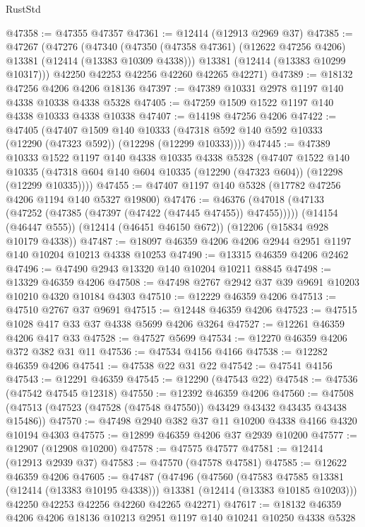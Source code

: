 \begin{lexlean}{RustStd}
\begin{coremodule}
@47358 := @47355 @47357
@47361 := @12414 (@12913 @2969 @37)
@47385 := @47267
    (@47276
      (@47340
        (@47350 (@47358 @47361) (@12622 @47256 @4206) @13381 (@12414 (@13383 @10309 @4338)))
        @13381
        (@12414 (@13383 @10299 @10317)))
      @42250
      @42253
      @42256
      @42260
      @42265
      @42271)
@47389 := @18132 @47256 @4206 @4206 @18136
@47397 := @47389 @10331 @2978 @1197 @140 @4338 @10338 @4338 @5328
@47405 := @47259 @1509 @1522 @1197 @140 @4338 @10333 @4338 @10338
@47407 := @14198 @47256 @4206
@47422 := @47405
    (@47407
      @1509
      @140
      @10333
      (@47318 @592 @140 @592 @10333 (@12290 (@47323 @592)) (@12298 (@12299 @10333))))
@47445 := @47389
    @10333
    @1522
    @1197
    @140
    @4338
    @10335
    @4338
    @5328
    (@47407
      @1522
      @140
      @10335
      (@47318 @604 @140 @604 @10335 (@12290 (@47323 @604)) (@12298 (@12299 @10335))))
@47455 := @47407 @1197 @140 @5328 (@17782 @47256 @4206 @1194 @140 @5327 @19800)
@47476 := @46376
    (@47018 (@47133 (@47252 (@47385 (@47397 (@47422 (@47445 @47455)) @47455)))))
    (@14154 (@46447 @555))
    (@12414 (@46451 @46150 @672))
    (@12206 (@15834 @928 @10179 @4338))
@47487 := @18097 @46359 @4206 @4206 @2944 @2951 @1197 @140 @10204 @10213 @4338 @10253
@47490 := @13315 @46359 @4206 @2462
@47496 := @47490 @2943 @13320 @140 @10204 @10211 @8845
@47498 := @13329 @46359 @4206
@47508 := @47498 @2767 @2942 @37 @39 @9691 @10203 @10210 @4320 @10184 @4303
@47510 := @12229 @46359 @4206
@47513 := @47510 @2767 @37 @9691
@47515 := @12448 @46359 @4206
@47523 := @47515 @1028 @417 @33 @37 @4338 @5699 @4206 @3264
@47527 := @12261 @46359 @4206 @417 @33
@47528 := @47527 @5699
@47534 := @12270 @46359 @4206 @372 @382 @31 @11
@47536 := @47534 @4156 @4166
@47538 := @12282 @46359 @4206
@47541 := @47538 @22 @31 @22
@47542 := @47541 @4156
@47543 := @12291 @46359
@47545 := @12290 (@47543 @22)
@47548 := @47536 (@47542 @47545 @12318)
@47550 := @12392 @46359 @4206
@47560 := @47508 (@47513 (@47523 (@47528 (@47548 @47550)) @43429 @43432 @43435 @43438 @15486))
@47570 := @47498 @2940 @382 @37 @11 @10200 @4338 @4166 @4320 @10194 @4303
@47575 := @12899 @46359 @4206 @37 @2939 @10200
@47577 := @12907 (@12908 @10200)
@47578 := @47575 @47577
@47581 := @12414 (@12913 @2939 @37)
@47583 := @47570 (@47578 @47581)
@47585 := @12622 @46359 @4206
@47605 := @47487
    (@47496
      (@47560
        (@47583 @47585 @13381 (@12414 (@13383 @10195 @4338)))
        @13381
        (@12414 (@13383 @10185 @10203)))
      @42250
      @42253
      @42256
      @42260
      @42265
      @42271)
@47617 := @18132 @46359 @4206 @4206 @18136 @10213 @2951 @1197 @140 @10241 @10250 @4338 @5328

\end{coremodule}
\end{lexlean}
